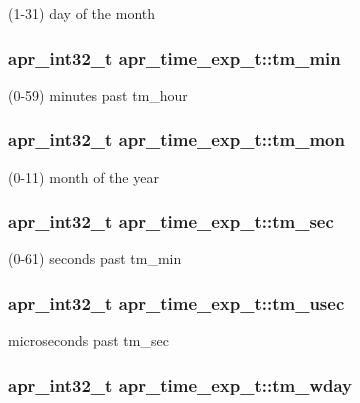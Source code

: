 (1-\/31) day of the month \hypertarget{structapr__time__exp__t_a56a380db482ba5b2bef43351faad27fb}{
\subsubsection[{tm\-\_\-min}]{\setlength{\rightskip}{0pt plus 5cm}apr\-\_\-int32\-\_\-t apr\-\_\-time\-\_\-exp\-\_\-t\-::tm\-\_\-min}}\label{structapr__time__exp__t_a56a380db482ba5b2bef43351faad27fb}
(0-\/59) minutes past tm\-\_\-hour \hypertarget{structapr__time__exp__t_a746f38956dfeb6be3bd17282791e3577}{
\subsubsection[{tm\-\_\-mon}]{\setlength{\rightskip}{0pt plus 5cm}apr\-\_\-int32\-\_\-t apr\-\_\-time\-\_\-exp\-\_\-t\-::tm\-\_\-mon}}\label{structapr__time__exp__t_a746f38956dfeb6be3bd17282791e3577}
(0-\/11) month of the year \hypertarget{structapr__time__exp__t_a2c29c99a75b55237917cb05ebae6706c}{
\subsubsection[{tm\-\_\-sec}]{\setlength{\rightskip}{0pt plus 5cm}apr\-\_\-int32\-\_\-t apr\-\_\-time\-\_\-exp\-\_\-t\-::tm\-\_\-sec}}\label{structapr__time__exp__t_a2c29c99a75b55237917cb05ebae6706c}
(0-\/61) seconds past tm\-\_\-min \hypertarget{structapr__time__exp__t_ac5f11e3c1f5a30d357df2108296a8d30}{
\subsubsection[{tm\-\_\-usec}]{\setlength{\rightskip}{0pt plus 5cm}apr\-\_\-int32\-\_\-t apr\-\_\-time\-\_\-exp\-\_\-t\-::tm\-\_\-usec}}\label{structapr__time__exp__t_ac5f11e3c1f5a30d357df2108296a8d30}
microseconds past tm\-\_\-sec \hypertarget{structapr__time__exp__t_a57e892bbf3c52df34dcff2c6a9f1adbf}{
\subsubsection[{tm\-\_\-wday}]{\setlength{\rightskip}{0pt plus 5cm}apr\-\_\-int32\-\_\-t apr\-\_\-time\-\_\-exp\-\_\-t\-::tm\-\_\-wday}}\label{structapr__time__exp__t_a57e892bbf3c52df34dcff2c6a9f1adbf}
